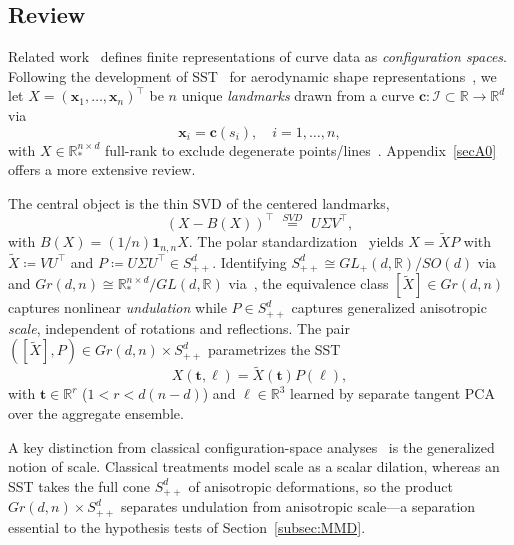 \documentclass[pdflatex,iicol]{sn-jnl}%
\theoremstyle{thmstyleone}%
\theoremstyle{thmstyletwo}%
\theoremstyle{thmstylethree}%
\begin{document}
\subsection{Review} \label{subsec:SST}
Related work~\cite{grey2023separable, bryner20142d, srivastava2016functional, kendall2009shape} defines finite representations of curve data as \textit{configuration spaces}. Following the development of SST~\cite{grey2023separable} for aerodynamic shape representations~\cite{doronina2022grassmannian}, we let $X = (\boldsymbol{x}_1,\dots,\boldsymbol{x}_n)^{\top}$ be $n$ unique \emph{landmarks} drawn from a curve $\boldsymbol{c}:\mathcal{I} \subset \mathbb{R} \rightarrow \mathbb{R}^d$ via
\begin{equation}\label{eq:data}
    \boldsymbol{x}_i = \boldsymbol{c}(s_i), \quad i=1,\dots,n,
\end{equation}
with $X\in\mathbb{R}^{n\times d}_*$ full-rank to exclude degenerate points/lines~\cite{absil2008optimization, grey2023separable}. Appendix~\ref{secA0} offers a more extensive review.

The central object is the thin SVD of the centered landmarks,
\begin{equation} \label{eq:landmark_stnd}
    (X - B(X))^{\top} \,\,\overset{SVD}{=}\,\, U\Sigma V^{\top},
\end{equation}
with $B(X) = (1/n)\boldsymbol{1}_{n,n}X$. The polar standardization~\cite{grey2023separable} yields $X = \widetilde{X}P$ with $\widetilde{X} \coloneqq VU^{\top}$ and $P \coloneqq U\Sigma U^{\top}\in S^d_{++}$. Identifying $S^d_{++} \cong GL_+(d,\mathbb{R})/SO(d)$ via~\cite{fletcher2003statistics} and $Gr(d,n)\cong \mathbb{R}^{n\times d}_*/GL(d,\mathbb{R})$ via~\cite{absil2008optimization}, the equivalence class $[\widetilde{X}]\in Gr(d,n)$ captures nonlinear \emph{undulation} while $P\in S^d_{++}$ captures generalized anisotropic \emph{scale}, independent of rotations and reflections. The pair $([\widetilde{X}],P)\in Gr(d,n)\times S^d_{++}$ parametrizes the SST
\begin{equation}\label{eq:SST}
    X(\boldsymbol{t},\boldsymbol{\ell}) = \widetilde{X}(\boldsymbol{t})P(\boldsymbol{\ell}),
\end{equation}
with $\boldsymbol{t} \in \mathbb{R}^r$ ($1< r < d(n-d)$) and $\boldsymbol{\ell}\in \mathbb{R}^3$ learned by separate tangent PCA~\cite{fletcher2004principal, edelman1998geometry, grey2023separable} over the aggregate ensemble.

A key distinction from classical configuration-space analyses~\cite{kendall2009shape,srivastava2010shape,srivastava2016functional} is the generalized notion of scale. Classical treatments model scale as a scalar dilation, whereas an SST takes the full cone $S^d_{++}$ of anisotropic deformations, so the product $Gr(d,n)\times S^d_{++}$ separates undulation from anisotropic scale---a separation essential to the hypothesis tests of Section~\ref{subsec:MMD}.
\end{document}

